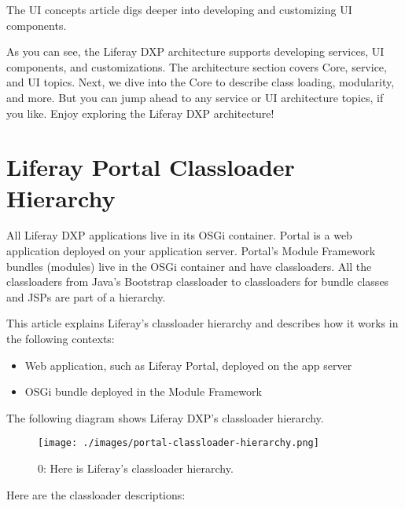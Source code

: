 The UI concepts article digs deeper into developing and customizing UI
components.

As you can see, the Liferay DXP architecture supports developing
services, UI components, and customizations. The architecture section
covers Core, service, and UI topics. Next, we dive into the Core to
describe class loading, modularity, and more. But you can jump ahead to
any service or UI architecture topics, if you like. Enjoy exploring the
Liferay DXP architecture!

\chapter{Liferay Portal Classloader
Hierarchy}\label{liferay-portal-classloader-hierarchy}

All Liferay DXP applications live in its OSGi container. Portal is a web
application deployed on your application server. Portal's Module
Framework bundles (modules) live in the OSGi container and have
classloaders. All the classloaders from Java's Bootstrap classloader to
classloaders for bundle classes and JSPs are part of a hierarchy.

This article explains Liferay's classloader hierarchy and describes how
it works in the following contexts:

\begin{itemize}
\tightlist
\item
  Web application, such as Liferay Portal, deployed on the app server
\item
  OSGi bundle deployed in the Module Framework
\end{itemize}

The following diagram shows Liferay DXP's classloader hierarchy.

\begin{figure}
\centering
\texttt{[image: ./images/portal-classloader-hierarchy.png]}
\caption{0: Here is Liferay's classloader hierarchy.}
\end{figure}

Here are the classloader descriptions:

